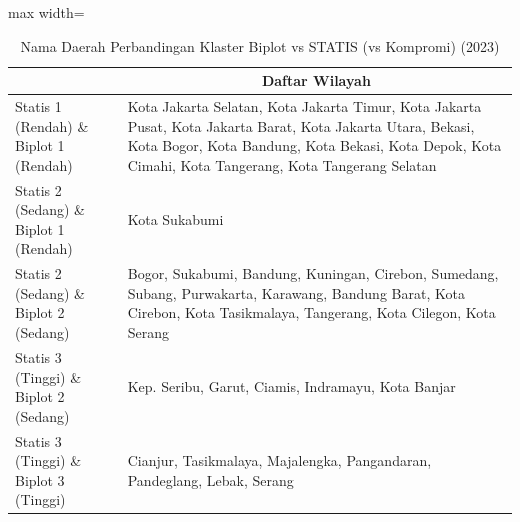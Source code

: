 \begin{table}[H]
\centering
\caption{Nama Daerah Perbandingan Klaster Biplot vs STATIS (vs Kompromi) (2023)} \label{tab:app2biplot_statis_name_2023}
\begin{adjustbox}{max width=\textwidth}
\begin{tabular}{|>{\centering\arraybackslash}p{4cm}|p{10cm}|}
\hline
\multicolumn{1}{|c|}{\textbf{Kategori}} & \multicolumn{1}{c|}{\textbf{Daftar Wilayah}} \\
\hline
Statis 1 (Rendah) \& Biplot 1 (Rendah) & Kota Jakarta Selatan, Kota Jakarta Timur, Kota Jakarta Pusat, Kota Jakarta Barat, Kota Jakarta Utara, Bekasi, Kota Bogor, Kota Bandung, Kota Bekasi, Kota Depok, Kota Cimahi, Kota Tangerang, Kota Tangerang Selatan \\
\hline
Statis 2 (Sedang) \& Biplot 1 (Rendah) & Kota Sukabumi \\
\hline
Statis 2 (Sedang) \& Biplot 2 (Sedang) & Bogor, Sukabumi, Bandung, Kuningan, Cirebon, Sumedang, Subang, Purwakarta, Karawang, Bandung Barat, Kota Cirebon, Kota Tasikmalaya, Tangerang, Kota Cilegon, Kota Serang \\
\hline
Statis 3 (Tinggi) \& Biplot 2 (Sedang) & Kep. Seribu, Garut, Ciamis, Indramayu, Kota Banjar \\
\hline
Statis 3 (Tinggi) \& Biplot 3 (Tinggi) & Cianjur, Tasikmalaya, Majalengka, Pangandaran, Pandeglang, Lebak, Serang \\
\hline
\end{tabular}
\end{adjustbox}
\end{table}